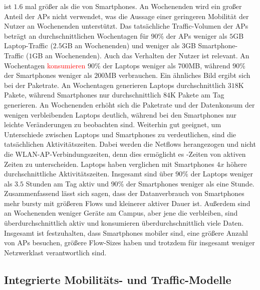 \documentclass[12pt, a4paper]{article}
\begin{document}
ist $1.6$ mal größer als die von Smartphones. An Wochenenden wird ein großer Anteil der APs nicht verwendet,
was die Aussage einer geringeren Mobilität der Nutzer an Wochenenden unterstützt.
Das tatsächliche Traffic-Volumen der APs beträgt an durchschnittlichen Wochentagen für $90 \%$ der APs
weniger als $5$\textsc{GB} Laptop-Traffic ($2.5$\textsc{GB} an Wochenenden) und weniger als $3$\textsc{GB} Smartphone-Traffic
($1$\textsc{GB} an Wochenenden).
Auch das Verhalten der Nutzer ist relevant. An Wochentagen \textcolor{red}{konsumieren} $90 \%$ der Laptops weniger als $700$\textsc{MB},
während $90 \%$ der Smartphones weniger als $200$\textsc{MB} verbrauchen.
Ein ähnliches Bild ergibt sich bei der Paketrate. An Wochentagen generieren Laptops durchschnittlich $318$\textsc{K} Pakete, 
während Smartphones nur durchschnittlich $84$\textsc{K} Pakete am Tag generieren. 
An Wochenenden erhöht sich die Paketrate und der Datenkonsum der wenigen verbleibenden Laptops deutlich,
während bei den Smartphones nur leichte Veränderungen zu beobachten sind.
Weiterhin gut geeignet, um Unterschiede zwischen Laptops und Smartphones zu verdeutlichen, sind die tatsächlichen Aktivitätszeiten.
Dabei werden die Netflows herangezogen und nicht die WLAN-AP-Verbindungszeiten, denn dies ermöglicht es -Zeiten
von aktiven Zeiten zu unterscheiden. Laptops haben verglichen mit Smartphones $4x$ höhere durchschnittliche Aktivitätszeiten.
Insgesamt sind über $90 \%$ der Laptops weniger als $3.5$ Stunden am Tag aktiv und $90 \%$ der Smartphones weniger als eine Stunde.\newline
Zusammenfassend lässt sich sagen, dass der Datanverbrauch von Smartphones mehr bursty mit größeren Flows und kleinerer aktiver
Dauer ist. Außerdem sind an Wochenenden weniger Geräte am Campus, aber jene die verbleiben, sind überdurchschnittlich aktiv 
und konsumieren überdurchschnittlich viele Daten. Insgesamt ist festzuhalten, dass Smartphones mobiler sind, 
eine größere Anzahl von APs besuchen, größere Flow-Sizes haben und trotzdem für insgesamt weniger Netzwerklast 
verantwortlich sind.

\vfill
\pagebreak

\subsection{Integrierte Mobilitäts- und Traffic-Modelle}
\end{document}
